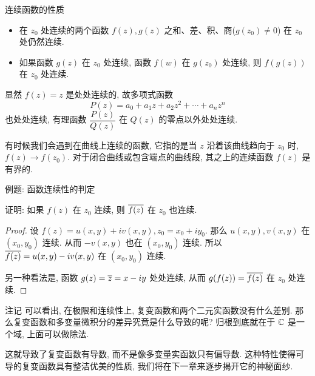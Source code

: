\begin{frame}{连续函数的性质}
\begin{theorem}
\begin{itemize}
\item 在 $z_0$ 处连续的两个函数 $f(z),g(z)$ 之和、差、积、商($g(z_0)\neq 0$) 在 $z_0$ 处仍然连续.
\item 如果函数 $g(z)$ 在 $z_0$ 处连续, 函数 $f(w)$ 在 $g(z_0)$ 处连续, 则 $f(g(z))$ 在 $z_0$ 处连续.
\end{itemize}
\end{theorem}

\onslide<+->
显然 $f(z)=z$ 是处处连续的,
\onslide<+->
故多项式函数
\[P(z)=a_0+a_1z+a_2z^2+\cdots+a_nz^n\]
也处处连续,
\onslide<+->
有理函数 $\dfrac{P(z)}{Q(z)}$ 在 $Q(z)$ 的零点以外处处连续.

\onslide<+->
有时候我们会遇到在曲线上连续的函数, 它指的是当 $z$ 沿着该曲线趋向于 $z_0$ 时, $f(z)\to f(z_0)$.
\onslide<+->
对于闭合曲线或包含端点的曲线段, 其之上的连续函数 $f(z)$ 是有界的.
\end{frame}


\begin{frame}{例题: 函数连续性的判定}
\begin{example}
证明: 如果 $f(z)$ 在 $z_0$ 连续, 则 $\overline{f(z)}$ 在 $z_0$ 也连续.
\end{example}
\begin{proof}
\indent
设 $f(z)=u(x,y)+iv(x,y),z_0=x_0+iy_0$.
\onslide<+->
那么 $u(x,y),v(x,y)$ 在 $(x_0,y_0)$ 连续.
\onslide<+->
从而 $-v(x,y)$ 也在 $(x_0,y_0)$ 连续.
\onslide<+->
所以 $\overline{f(z)}=u(x,y)-iv(x,y)$ 在 $(x_0,y_0)$ 连续.

\indent
\onslide<+->
另一种看法是, 函数 $g(z)=\overline z=x-iy$ 处处连续,
\onslide<+->
从而 $g(f(z))=\overline{f(z)}$ 在 $z_0$ 处连续.
\end{proof}
\end{frame}


\begin{frame}{注记}
\onslide<+->
可以看出, 在极限和连续性上, 复变函数和两个二元实函数没有什么差别.
\onslide<+->
那么复变函数和多变量微积分的差异究竟是什么导致的呢?
\onslide<+->
归根到底就在于 ${\mathbb{C}}$ 是一个域, 上面可以做除法.

\onslide<+->
这就导致了复变函数有\alert{导数}, 而不是像多变量实函数只有偏导数.
\onslide<+->
这种特性使得可导的复变函数具有整洁优美的性质, 我们将在下一章来逐步揭开它的神秘面纱.
\end{frame}

